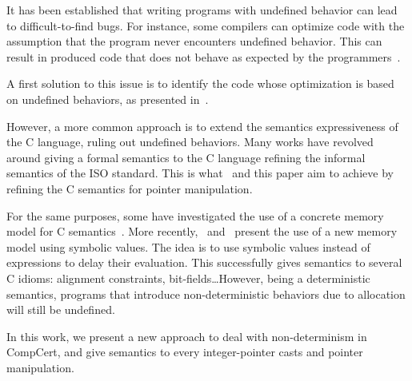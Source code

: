 It has been established that writing programs with undefined behavior can lead to difficult-to-find bugs.
For instance, some compilers can optimize code with the assumption that the program never encounters undefined behavior. This can result in produced code that does not behave as expected by the programmers~\cite{DBLP:conf/apsys/WangCCJZK12}.

A first solution to this issue is to identify the code whose optimization is based on undefined behaviors, as presented in~\cite{DBLP:conf/sosp/WangZKS13}.

However, a more common approach is to extend the semantics expressiveness of the C language, ruling out undefined behaviors.
Many works have revolved around giving a formal semantics to the C language refining the informal semantics of the ISO standard.
This is what~\cite{DBLP:conf/pldi/KangHMGZV15} and this paper aim to achieve by refining the C semantics for pointer manipulation.

For the same purposes, some have investigated the use of a concrete memory model for C semantics~\cite{DBLP:conf/popl/TuchKN07}\cite{Norrish98cformalised}.
More recently,~\cite{besson:hal-01093312} and~\cite{DBLP:conf/itp/BessonBW15} present the use of a new memory model using symbolic values. The idea is to use symbolic values instead of expressions to delay their evaluation. This successfully gives semantics to several C idioms: alignment constraints, bit-fields\dots However, being a deterministic semantics, programs that introduce non-deterministic behaviors due to allocation will still be undefined.

In this work, we present a new approach to deal with non-determinism in CompCert, and give semantics to every integer-pointer casts and pointer manipulation.

